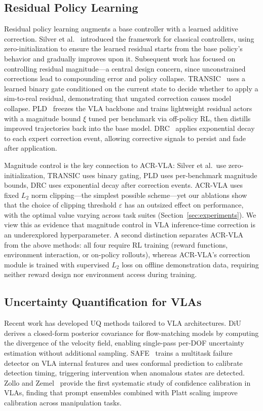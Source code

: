 \subsection{Residual Policy Learning}

Residual policy learning augments a base controller with a learned additive correction.
Silver et al.~\cite{silver2018residual} introduced the framework for classical controllers, using zero-initialization to ensure the learned residual starts from the base policy's behavior and gradually improves upon it.
Subsequent work has focused on controlling residual magnitude---a central design concern, since unconstrained corrections lead to compounding error and policy collapse.
TRANSIC~\cite{jiang2024transic} uses a learned binary gate conditioned on the current state to decide whether to apply a sim-to-real residual, demonstrating that ungated correction causes model collapse.
PLD~\cite{xiao2026pld} freezes the VLA backbone and trains lightweight residual actors with a magnitude bound $\xi$ tuned per benchmark via off-policy RL, then distills improved trajectories back into the base model.
DRC~\cite{pan2025drc} applies exponential decay to each expert correction event, allowing corrective signals to persist and fade after application.

Magnitude control is the key connection to ACR-VLA: Silver et al.\ use zero-initialization, TRANSIC uses binary gating, PLD uses per-benchmark magnitude bounds, DRC uses exponential decay after correction events.
ACR-VLA uses fixed $L_2$ norm clipping---the simplest possible scheme---yet our ablations show that the choice of clipping threshold $\varepsilon$ has an outsized effect on performance, with the optimal value varying across task suites (Section~\ref{sec:experiments}).
We view this as evidence that magnitude control in VLA inference-time correction is an underexplored hyperparameter.
A second distinction separates ACR-VLA from the above methods: all four require RL training (reward functions, environment interaction, or on-policy rollouts), whereas ACR-VLA's correction module is trained with supervised $L_2$ loss on offline demonstration data, requiring neither reward design nor environment access during training.

\subsection{Uncertainty Quantification for VLAs}

Recent work has developed UQ methods tailored to VLA architectures.
DiU~\cite{xing2026diu} derives a closed-form posterior covariance for flow-matching models by computing the divergence of the velocity field, enabling single-pass per-DOF uncertainty estimation without additional sampling.
SAFE~\cite{gu2025safe} trains a multitask failure detector on VLA internal features and uses conformal prediction to calibrate detection timing, triggering intervention when anomalous states are detected.
Zollo and Zemel~\cite{zollo2025vla_calibration} provide the first systematic study of confidence calibration in VLAs, finding that prompt ensembles combined with Platt scaling improve calibration across manipulation tasks.

